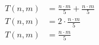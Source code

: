 \begin{subequations}
\begin{align}
\label{eq:findedgels7}
T(n,m)& = \frac{n \cdot m}{5} + \frac{n \cdot m}{5}\\
\label{eq:findedgels8}
T(n,m)& = 2 \cdot \frac{n \cdot m}{5}\\
\label{eq:findedgels9}
T(n,m)& = \frac{n \cdot m}{5}
\end{align}
\end{subequations}
